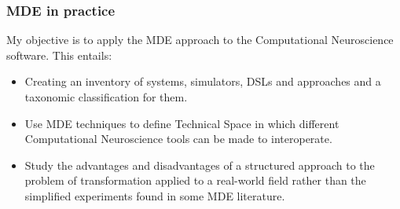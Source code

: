 \documentclass{beamer}
\begin{document}
\begin{frame}
\frametitle{MDE in practice}

My objective is to apply the MDE approach to the Computational
Neuroscience software. This entails:

\begin{itemize}
\item Creating an inventory of systems, simulators, DSLs and
  approaches and a taxonomic classification for them.
  \pause
\item Use MDE techniques to define Technical Space in which different
  Computational Neuroscience tools can be made to interoperate.
  \pause
\item Study the advantages and disadvantages of a structured approach
  to the problem of transformation applied to a real-world field
  rather than the simplified experiments found in some MDE
  literature.
\end{itemize}

\end{frame}

\begin{frame}
  \printbibliography
\end{frame}
\end{document}
